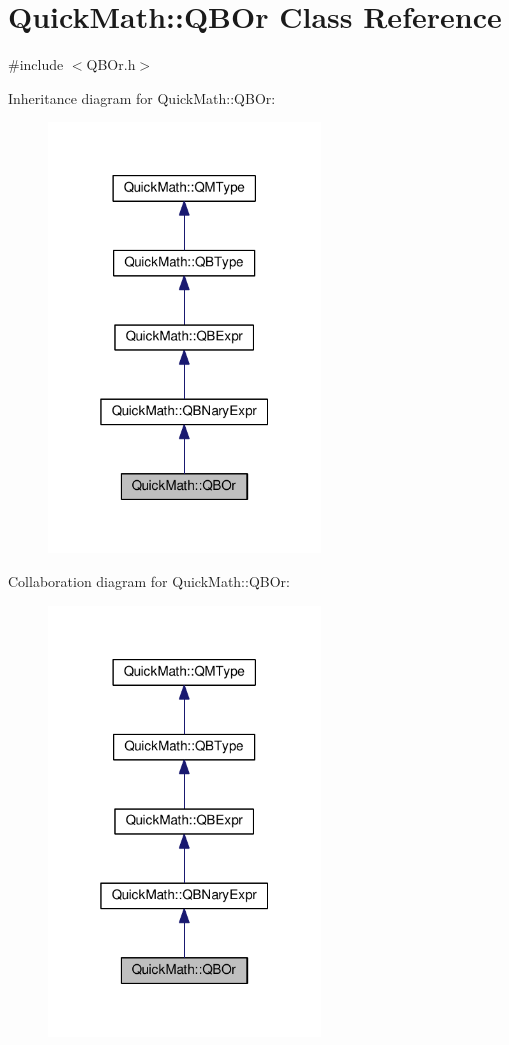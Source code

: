 \hypertarget{classQuickMath_1_1QBOr}{}\section{Quick\+Math\+:\+:Q\+B\+Or Class Reference}
\label{classQuickMath_1_1QBOr}


{\ttfamily \#include $<$Q\+B\+Or.\+h$>$}



Inheritance diagram for Quick\+Math\+:\+:Q\+B\+Or\+:
\nopagebreak
\begin{figure}[H]
\begin{center}
\leavevmode
\includegraphics[width=205pt]{classQuickMath_1_1QBOr__inherit__graph}
\end{center}
\end{figure}


Collaboration diagram for Quick\+Math\+:\+:Q\+B\+Or\+:
\nopagebreak
\begin{figure}[H]
\begin{center}
\leavevmode
\includegraphics[width=205pt]{classQuickMath_1_1QBOr__coll__graph}
\end{center}
\end{figure}
